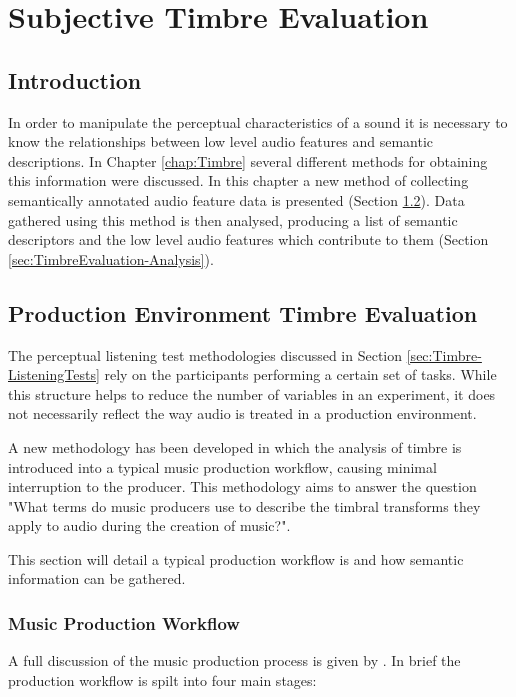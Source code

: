 \chapter{Subjective Timbre Evaluation}
\label{chap:TimbreEvaluation}

\section{Introduction}
\label{sec:TimbreEvaluation-Introduction}
	In order to manipulate the perceptual characteristics of a sound it is necessary to know the relationships between
	low level audio features and semantic descriptions. In Chapter \ref{chap:Timbre} several different methods for
	obtaining this information were discussed.  In this chapter a new method of collecting semantically annotated audio
	feature data is presented (Section \ref{sec:TimbreEvaluation-DAWBasedTimbreEvaluation}). Data gathered using this
	method is then analysed, producing a list of semantic descriptors and the low level audio features which contribute
	to them (Section \ref{sec:TimbreEvaluation-Analysis}).

\section{Production Environment Timbre Evaluation} %
\label{sec:TimbreEvaluation-DAWBasedTimbreEvaluation}
	The perceptual listening test methodologies discussed in Section \ref{sec:Timbre-ListeningTests} rely on the
	participants performing a certain set of tasks. While this structure helps to reduce the number of variables in an
	experiment, it does not necessarily reflect the way audio is treated in a production environment.

	A new methodology has been developed in which the analysis of timbre is introduced into a typical music production
	workflow, causing minimal interruption to the producer. This methodology aims to answer the question "What terms do
	music producers use to describe the timbral transforms they apply to audio during the creation of music?". 

	This section will detail a typical production workflow is and how semantic information can be gathered.

	\subsection{Music Production Workflow}
	\label{sec:TimbreEvaluation-DAWBasedTimbreEvaluation-Workflow}
		A full discussion of the music production process is given by \citet{dittmar2013audio}. In brief the
		production workflow is spilt into four main stages:

